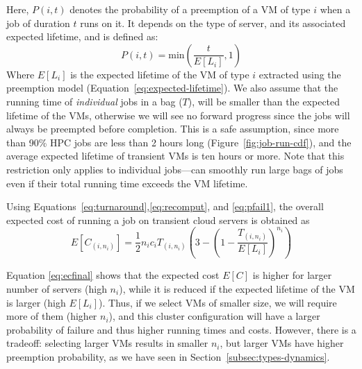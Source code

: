 Here, $P(i, t)$ denotes the probability of a preemption of a VM of type $i$ when a job of duration $t$ runs on it. 
%
It depends on the type of server, and its associated expected lifetime, and is defined as:
\begin{equation}
  \label{eq:pi}
  P(i, t) = \text{min}\left(\dfrac{t}{E[L_i]}, 1\right)
\end{equation}
Where $E[L_i]$ is the expected lifetime of the VM of type $i$ extracted using the preemption model (Equation~\ref{eq:expected-lifetime}).
We also assume that the running time of \emph{individual} jobs in a bag ($T$), will be smaller than the expected lifetime of the VMs, otherwise we will see no forward progress since the jobs will always be preempted before completion.
This is a safe assumption, since more than 90\% HPC jobs are less than 2 hours long (Figure~\ref{fig:job-run-cdf}), and the average expected lifetime of transient VMs is ten hours or more.
Note that this restriction only applies to individual jobs---\sysname can smoothly run large bags of jobs even if their total running time exceeds the VM lifetime. 



Using Equations~\ref{eq:turnaround},\ref{eq:recomput}, and \ref{eq:pfail1}, the overall expected cost of running a job on transient cloud servers is obtained as
\begin{equation}
  \label{eq:ecfinal}
  E[C_{( i,n_i )}] = \frac{1}{2}n_i c_i T_{( i,n_i )}\left(3 - \left(1-\dfrac{T_{( i,n_i )}}{E[L_i]}\right)^{n_i}\right)
\end{equation}

Equation \ref{eq:ecfinal} shows that the expected cost $E[C]$ is higher for larger number of servers (high $n_i$), while it is reduced if the expected lifetime of the VM is larger (high $E[L_i]$).
%
Thus, if we select VMs of smaller size, we will require more of them (higher $n_i$), and this cluster configuration will have a larger probability of failure and thus higher running times and costs.
However, there is a tradeoff: selecting larger VMs results in smaller $n_i$, but larger VMs have higher preemption probability, as we have seen in Section~\ref{subsec:types-dynamics}. 



